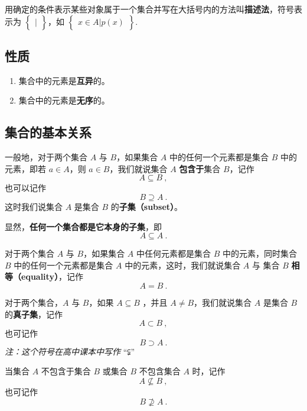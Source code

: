 用确定的条件表示某些对象属于一个集合并写在大括号内的方法叫\textbf{描述法}，符号表示为 $\begin{Bmatrix} | \end{Bmatrix}$，如 $\begin{Bmatrix} x\in A|p(x) \end{Bmatrix}$.

\subsection{性质}
\begin{enumerate}
\item 集合中的元素是\textbf{互异}的。
\item 集合中的元素是\textbf{无序}的。
\end{enumerate}

\subsection{集合的基本关系}
一般地，对于两个集合 $A$ 与 $B$，如果集合 $A$ 中的任何一个元素都是集合 $B$ 中的元素，即若 $a\in A$，则 $a\in B$，我们就说集合 $A$ \textbf{包含于}集合 $B$，记作
\begin{equation}
A \subseteq B~,
\end{equation}
也可以记作
\begin{equation}
B \supseteq A~.
\end{equation}
这时我们说集合 $A$ 是集合 $B$ 的\textbf{子集（subset）}。

显然，\textbf{任何一个集合都是它本身的子集}，即
\begin{equation}
A \subseteq A~.
\end{equation}

对于两个集合 $A$ 与 $B$，如果集合 $A$ 中任何元素都是集合 $B$ 中的元素，同时集合 $B$ 中的任何一个元素都是集合 $A$ 中的元素，这时，我们就说集合 $A$ 与 集合 $B$ \textbf{相等（equality）}，记作
\begin{equation}
A=B~.
\end{equation}

对于两个集合，$A$ 与 $B$，如果 $A\subseteq B$ ，并且 $A \ne B$，我们就说集合 $A$ 是集合 $B$ 的\textbf{真子集}，记作
\begin{equation}
A \subset B~,
\end{equation}
也可记作
\begin{equation}
B \supset A~.
\end{equation}
\textsl{注：这个符号在高中课本中写作} “⫋”

当集合 $A$ 不包含于集合 $B$ 或集合 $B$ 不包含集合 $A$ 时，记作
\begin{equation}
A \nsubseteq B~,
\end{equation}
也可记作
\begin{equation}
B \nsupseteq A~.
\end{equation}

